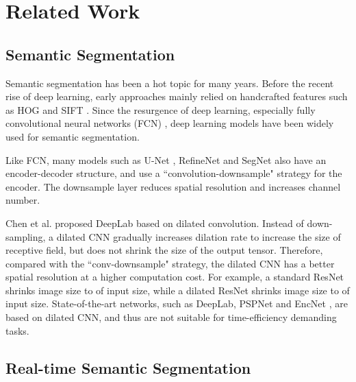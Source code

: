 \documentclass[10pt,twocolumn,letterpaper]{article}
\begin{document}
\section{Related Work}
\subsection{Semantic Segmentation}
Semantic segmentation has been a hot topic for many years. Before the recent rise of deep learning, early approaches mainly relied on handcrafted features such as HOG \cite{dalal2005histograms} and SIFT \cite{lowe2004distinctive}. Since the resurgence of deep learning, especially fully convolutional neural networks (FCN) \cite{long2015fully}, deep learning models have been widely used for semantic segmentation.



Like FCN, many models such as U-Net \cite{ronneberger2015u}, RefineNet \cite{lin2017refinenet} and SegNet \cite{badrinarayanan2015segnet} also have an encoder-decoder structure, and use a ``convolution-downsample" strategy for the encoder. The downsample layer reduces spatial resolution and increases channel number. 
  
 Chen et al. proposed DeepLab \cite{chen2016deeplab} based on dilated convolution. Instead of down-sampling, a dilated CNN gradually increases dilation rate to increase the size of receptive field, but does not shrink the size of the output tensor. Therefore, compared with the ``conv-downsample" strategy, the dilated CNN has a better spatial resolution at a higher computation cost. For example, a standard ResNet shrinks image size to  of input size, while a dilated ResNet shrinks image size to  of input size. State-of-the-art networks, such as DeepLab\cite{chen2016deeplab}, PSPNet \cite{zhao2017pyramid} and EncNet \cite{zhang2018context}, are based on dilated CNN, and thus are not suitable for time-efficiency demanding tasks.
 
\subsection{Real-time Semantic Segmentation}
\end{document}
